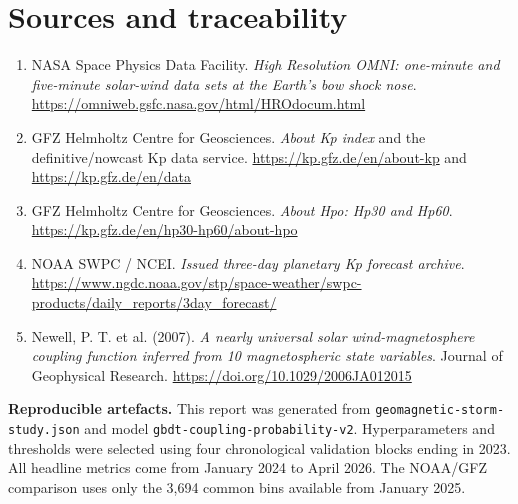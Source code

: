 \documentclass[10pt,a4paper]{article}
\let\plainsection\section
\renewcommand{\section}[1]{\plainsection{\color{Navy}#1}}
\newenvironment{resultbox}{\begin{center}\setlength{\fboxsep}{3mm}\begin{lrbox}{\resultsave}\begin{minipage}{0.91\textwidth}}{\end{minipage}\end{lrbox}\fcolorbox{Line}{white}{\usebox{\resultsave}}\end{center}}
\begin{document}
\section{Sources and traceability}

\small
\begin{enumerate}
  \item NASA Space Physics Data Facility. \textit{High Resolution OMNI: one-minute and five-minute solar-wind data sets at the Earth's bow shock nose}. \url{https://omniweb.gsfc.nasa.gov/html/HROdocum.html}
  \item GFZ Helmholtz Centre for Geosciences. \textit{About Kp index} and the definitive/nowcast Kp data service. \url{https://kp.gfz.de/en/about-kp} and \url{https://kp.gfz.de/en/data}
  \item GFZ Helmholtz Centre for Geosciences. \textit{About Hpo: Hp30 and Hp60}. \url{https://kp.gfz.de/en/hp30-hp60/about-hpo}
  \item NOAA SWPC / NCEI. \textit{Issued three-day planetary Kp forecast archive}. \url{https://www.ngdc.noaa.gov/stp/space-weather/swpc-products/daily_reports/3day_forecast/}
  \item Newell, P. T. et al. (2007). \textit{A nearly universal solar wind-magnetosphere coupling function inferred from 10 magnetospheric state variables}. Journal of Geophysical Research. \url{https://doi.org/10.1029/2006JA012015}
\end{enumerate}

\vfill
\begin{resultbox}
\scriptsize\color{Muted}\textbf{Reproducible artefacts.} This report was generated from \texttt{geomagnetic-storm-study.json} and model \texttt{gbdt-coupling-probability-v2}. Hyperparameters and thresholds were selected using four chronological validation blocks ending in 2023. All headline metrics come from January 2024 to April 2026. The NOAA/GFZ comparison uses only the 3,694 common bins available from January 2025.
\end{resultbox}
\end{document}
